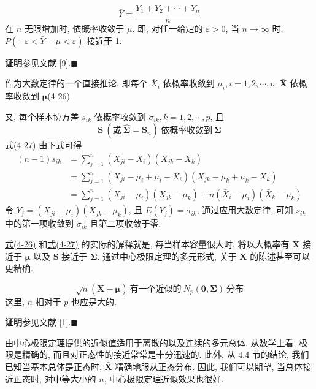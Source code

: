 \[
\bar{Y}=\frac{Y_{1}+Y_{2}+\cdots+Y_{n}}{n}
\]
在 $n$ 无限增加时, 依概率收敛于 $\mu$. 即, 对任一给定的 $\varepsilon>0$, 当 $n\to\infty$ 时, $P(-\varepsilon<\bar{Y}-\mu<\varepsilon)$ 接近于 1.

\noindent\textbf{证明}\quad 参见文献 [9].\hfill$\blacksquare$

作为大数定律的一个直接推论, 即每个 $\bar{X}_{i}$ 依概率收敛到 $\mu_{i},i=1,2,\cdots,p$, $\bar{\mathbf{X}}$ 依概率收敛到 $\boldsymbol{\mu}$\label{eq:4-26}\hfill (4-26)

又, 每个样本协方差 $s_{ik}$ 依概率收敛到 $\sigma_{ik},k=1,2,\cdots,p$, 且
\label{eq:4-27}
\begin{equation}
\mathbf{S}\ (\text{或}\ \hat{\boldsymbol{\Sigma}}=\mathbf{S}_{n})\ \text{依概率收敛到}\ \boldsymbol{\Sigma} \tag{4-27}
\end{equation}
\hyperref[eq:4-27]{式(4-27)} 由下式可得
\begin{align*}
(n-1)s_{ik}&=\sum_{j=1}^{n}(X_{ji}-\bar{X}_{i})(X_{jk}-\bar{X}_{k})\\
&=\sum_{j=1}^{n}(X_{ji}-\mu_{i}+\mu_{i}-\bar{X}_{i})(X_{jk}-\mu_{k}+\mu_{k}-\bar{X}_{k})\\
&=\sum_{j=1}^{n}(X_{ji}-\mu_{i})(X_{jk}-\mu_{k})+n(\bar{X}_{i}-\mu_{i})(\bar{X}_{k}-\mu_{k})
\end{align*}
令 $Y_{j}=(X_{ji}-\mu_{i})(X_{jk}-\mu_{k})$, 且 $E(Y_{j})=\sigma_{ik}$, 通过应用大数定律, 可知 $s_{ik}$ 中的第一项收敛到 $\sigma_{ik}$ 且第二项收敛于零.

\hyperref[eq:4-26]{式(4-26)} 和\hyperref[eq:4-27]{式(4-27)} 的实际的解释就是, 每当样本容量很大时, 将以大概率有 $\bar{\mathbf{X}}$ 接近于 $\boldsymbol{\mu}$ 以及 $\mathbf{S}$ 接近于 $\boldsymbol{\Sigma}$. 通过中心极限定理的多元形式, 关于 $\bar{\mathbf{X}}$ 的陈述甚至可以更精确.

\[
\sqrt{n}(\bar{\mathbf{X}}-\boldsymbol{\mu})\ \text{有一个近似的}\ N_{p}(\mathbf{0},\boldsymbol{\Sigma})\ \text{分布}
\]
这里, $n$ 相对于 $p$ 也应是大的.

\noindent\textbf{证明}\quad 参见文献 [1].\hfill$\blacksquare$

由中心极限定理提供的近似值适用于离散的以及连续的多元总体. 从数学上看, 极限是精确的, 而且对正态性的接近常常是十分迅速的. 此外, 从 4.4 节的结论, 我们已知当基本总体是正态时, $\bar{\mathbf{X}}$ 精确地服从正态分布. 因此, 我们可以期望, 当总体接近正态时, 对中等大小的 $n$, 中心极限定理近似效果也很好.

